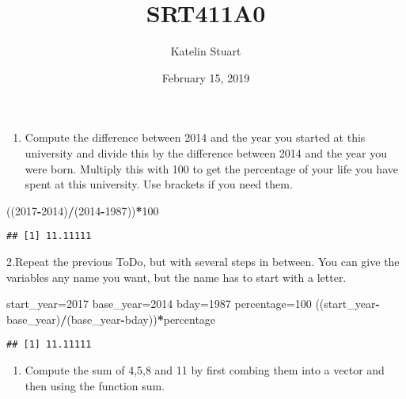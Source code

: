 \documentclass[]{article}
\title{SRT411A0}
\author{Katelin Stuart}
\date{February 15, 2019}
\newenvironment{Shaded}{\begin{snugshade}}{\end{snugshade}}
\newcommand{\DecValTok}[1]{\textcolor[rgb]{0.00,0.00,0.81}{#1}}
\newcommand{\OperatorTok}[1]{\textcolor[rgb]{0.81,0.36,0.00}{\textbf{#1}}}
\newcommand{\NormalTok}[1]{#1}
\providecommand{\tightlist}{%
  \setlength{\itemsep}{0pt}\setlength{\parskip}{0pt}}
\begin{document}
\maketitle

\begin{enumerate}
\def\labelenumi{\arabic{enumi}.}
\tightlist
\item
  Compute the difference between 2014 and the year you started at this
  university and divide this by the difference between 2014 and the year
  you were born. Multiply this with 100 to get the percentage of your
  life you have spent at this university. Use brackets if you need them.
\end{enumerate}

\begin{Shaded}
\begin{Highlighting}[]
\NormalTok{((}\DecValTok{2017}\OperatorTok{-}\DecValTok{2014}\NormalTok{)}\OperatorTok{/}\NormalTok{(}\DecValTok{2014}\OperatorTok{-}\DecValTok{1987}\NormalTok{))}\OperatorTok{*}\DecValTok{100}
\end{Highlighting}
\end{Shaded}

\begin{verbatim}
## [1] 11.11111
\end{verbatim}

2.Repeat the previous ToDo, but with several steps in between. You can
give the variables any name you want, but the name has to start with a
letter.

\begin{Shaded}
\begin{Highlighting}[]
\NormalTok{start_year=}\DecValTok{2017}
\NormalTok{base_year=}\DecValTok{2014}
\NormalTok{bday=}\DecValTok{1987}
\NormalTok{percentage=}\DecValTok{100}
\NormalTok{((start_year}\OperatorTok{-}\NormalTok{base_year)}\OperatorTok{/}\NormalTok{(base_year}\OperatorTok{-}\NormalTok{bday))}\OperatorTok{*}\NormalTok{percentage}
\end{Highlighting}
\end{Shaded}

\begin{verbatim}
## [1] 11.11111
\end{verbatim}

\begin{enumerate}
\def\labelenumi{\arabic{enumi}.}
\setcounter{enumi}{2}
\tightlist
\item
  Compute the sum of 4,5,8 and 11 by first combing them into a vector
  and then using the function sum.
\end{enumerate}
\end{document}
